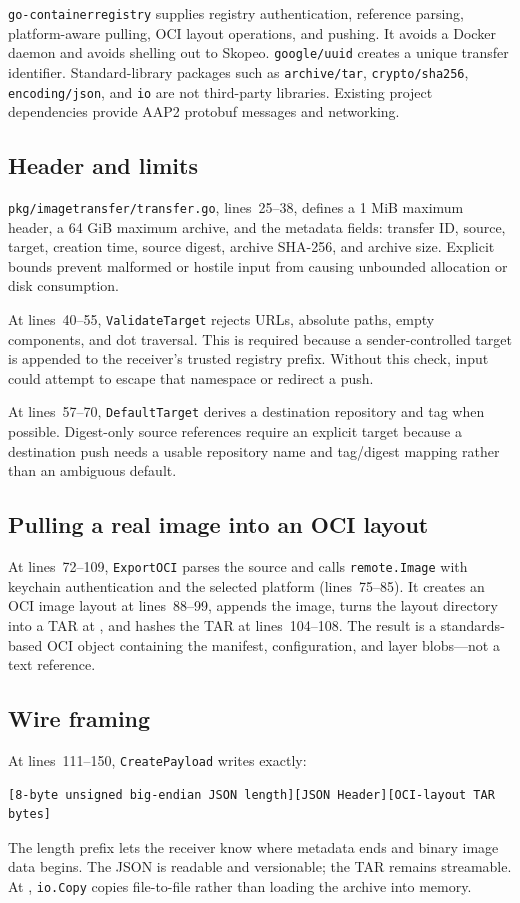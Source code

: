\documentclass[11pt,a4paper]{article}
\newcommand{\file}[1]{\texttt{#1}}
\newcommand{\lines}[1]{lines~#1}
\begin{document}
\file{go-containerregistry} supplies registry authentication, reference
parsing, platform-aware pulling, OCI layout operations, and pushing. It avoids
a Docker daemon and avoids shelling out to Skopeo. \file{google/uuid} creates a
unique transfer identifier. Standard-library packages such as
\file{archive/tar}, \file{crypto/sha256}, \file{encoding/json}, and
\file{io} are not third-party libraries. Existing project dependencies provide
AAP2 protobuf messages and networking.

\subsection{Header and limits}
\file{pkg/imagetransfer/transfer.go}, \lines{25--38}, defines a 1 MiB maximum
header, a 64 GiB maximum archive, and the metadata fields: transfer ID, source,
target, creation time, source digest, archive SHA-256, and archive size.
Explicit bounds prevent malformed or hostile input from causing unbounded
allocation or disk consumption.

At \lines{40--55}, \file{ValidateTarget} rejects URLs, absolute paths, empty
components, and dot traversal. This is required because a sender-controlled
target is appended to the receiver's trusted registry prefix. Without this
check, input could attempt to escape that namespace or redirect a push.

At \lines{57--70}, \file{DefaultTarget} derives a destination repository and
tag when possible. Digest-only source references require an explicit target
because a destination push needs a usable repository name and tag/digest
mapping rather than an ambiguous default.

\subsection{Pulling a real image into an OCI layout}
At \lines{72--109}, \file{ExportOCI} parses the source and calls
\file{remote.Image} with keychain authentication and the selected platform
(\lines{75--85}). It creates an OCI image layout at \lines{88--99}, appends the
image, turns the layout directory into a TAR at , and hashes the TAR
at \lines{104--108}. The result is a standards-based OCI object containing the
manifest, configuration, and layer blobs---not a text reference.

\subsection{Wire framing}
At \lines{111--150}, \file{CreatePayload} writes exactly:
\begin{verbatim}
[8-byte unsigned big-endian JSON length][JSON Header][OCI-layout TAR bytes]
\end{verbatim}
The length prefix lets the receiver know where metadata ends and binary image
data begins. The JSON is readable and versionable; the TAR remains streamable.
At , \file{io.Copy} copies file-to-file rather than loading the
archive into memory.
\end{document}
